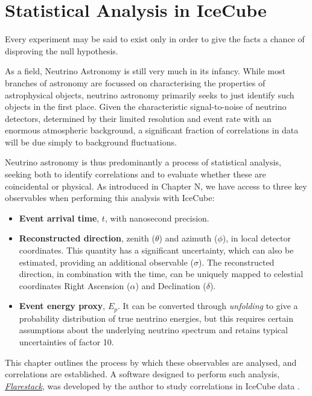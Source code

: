 \setchapterpreamble[u]{\margintoc}
\chapter{Statistical Analysis in IceCube}
\begin{fquote}Every experiment may be said to exist only in order to give the facts a chance of disproving the null hypothesis.
\end{fquote}

As a field, Neutrino Astronomy is still very much in its infancy. While most branches of astronomy are focussed on characterising the properties of astrophysical objects, neutrino astronomy primarily seeks to just identify such objects in the first place. Given the characteristic signal-to-noise of neutrino detectors, determined by their limited resolution and event rate with an enormous atmospheric background, a significant fraction of correlations in data will be due simply to background fluctuations.

Neutrino astronomy is thus predominantly a process of statistical analysis, seeking both to identify correlations and to evaluate whether these are coincidental or physical. As introduced in Chapter N, we have access to three key observables when performing this analysis with IceCube:

\begin{itemize}
	\item \textbf{Event arrival time}, $t$, with nanosecond precision.
	\item \textbf{Reconstructed direction},  zenith ($\theta$) and azimuth ($\phi$), in local detector coordinates. This quantity has a significant uncertainty, which can also be estimated, providing an additional observable ($\sigma$). The reconstructed direction, in combination with the time, can be uniquely mapped to celestial coordinates Right Ascension ($\alpha$) and Declination ($\delta$).
	\item \textbf{Event energy proxy}, $E_{p}$. It can be converted through \emph{unfolding} to give a probability distribution of true neutrino energies, but this requires certain assumptions about the underlying neutrino spectrum and retains typical uncertainties of factor 10.
\end{itemize}

This chapter outlines the process by which these observables are analysed, and correlations are established. A software designed to perform such analysis, \emph{\href{https://github.com/IceCubeOpenSource/flarestack}{Flarestack}}, was developed by the author to study correlations in IceCube data .

